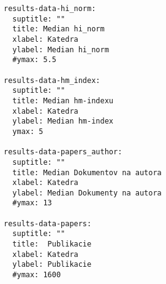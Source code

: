 \begin{source}
\begin{verbatim}
results-data-hi_norm:
  suptitle: ""
  title: Median hi_norm
  xlabel: Katedra
  ylabel: Median hi_norm
  #ymax: 5.5

results-data-hm_index:
  suptitle: ""
  title: Median hm-indexu
  xlabel: Katedra
  ylabel: Median hm-index
  ymax: 5

results-data-papers_author:
  suptitle: ""
  title: Median Dokumentov na autora
  xlabel: Katedra
  ylabel: Median Dokumenty na autora
  #ymax: 13

results-data-papers:
  suptitle: ""
  title:  Publikacie
  xlabel: Katedra
  ylabel: Publikacie
  #ymax: 1600
\end{verbatim}
\end{source}

